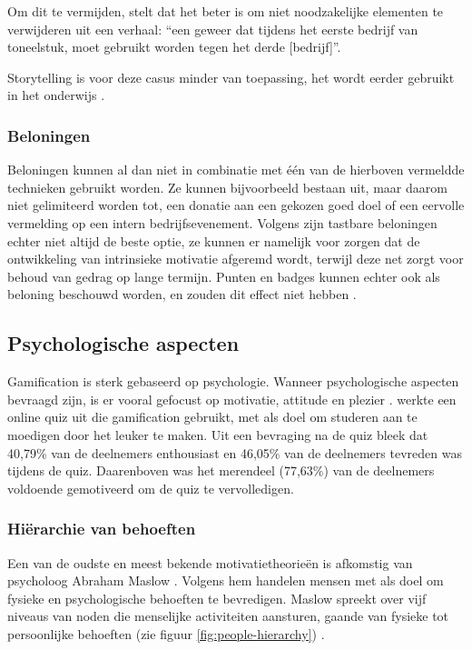 Om dit te vermijden, stelt \textcite{Duster1990} dat het beter is om niet noodzakelijke elementen te verwijderen uit een verhaal: ``een geweer dat tijdens het eerste bedrijf van toneelstuk, moet gebruikt worden tegen het derde [bedrijf]''.

Storytelling is voor deze casus minder van toepassing, het wordt eerder gebruikt in het onderwijs \autocite{Schmoelz2018}.

\subsubsection{Beloningen}
Beloningen kunnen al dan niet in combinatie met één van de hierboven vermeldde technieken gebruikt worden. Ze kunnen bijvoorbeeld bestaan uit, maar daarom niet gelimiteerd worden tot, een donatie aan een gekozen goed doel of een eervolle vermelding op een intern bedrijfsevenement.
Volgens \textcite{Lewis2016} zijn tastbare beloningen echter niet altijd de beste optie, ze kunnen er namelijk voor zorgen dat de ontwikkeling van intrinsieke motivatie afgeremd wordt, terwijl deze net zorgt voor behoud van gedrag op lange termijn. Punten en badges kunnen echter ook als beloning beschouwd worden, en zouden dit effect niet hebben \autocite{Lewis2016}.

\subsection{Psychologische aspecten}
Gamification is sterk gebaseerd op psychologie. Wanneer psychologische aspecten bevraagd zijn, is er vooral gefocust op motivatie, attitude en plezier \autocite{Hamari2014}. \textcite{Cheong2013} werkte een online quiz uit die gamification gebruikt, met als doel om studeren aan te moedigen door het leuker te maken. Uit een bevraging  na de quiz bleek dat 40,79\% van de deelnemers enthousiast en 46,05\% van de deelnemers tevreden was tijdens de quiz. Daarenboven was het merendeel (77,63\%) van de deelnemers voldoende gemotiveerd om de quiz te vervolledigen.

\subsubsection{Hiërarchie van behoeften}
Een van de oudste en meest bekende motivatietheorieën is afkomstig van psycholoog Abraham Maslow \autocite{Richter2014}. Volgens hem handelen mensen met als doel om fysieke en psychologische behoeften te bevredigen. Maslow spreekt over vijf niveaus van noden die menselijke activiteiten aansturen, gaande van fysieke tot persoonlijke behoeften (zie figuur \ref{fig:people-hierarchy}) \autocite{Lilienfeld2014}.

